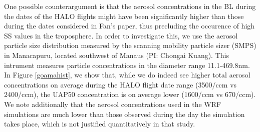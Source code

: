 \documentclass{article}
\begin{document}
One possible counterargument is that the aerosol concentrations in the BL during the dates of the HALO flights might have been significantly higher than those during the dates considered in Fan's paper, thus precluding the occurence of high SS values in the troposphere. In order to investigate this, we use the aerosol particle size distribution measured by the scanning mobility particle sizer (SMPS) in Manacapuru, located southwest of Manaus (PI: Chongai Kuang). This intrument measures particle concentrations in the diameter range 11.1-469.8nm. In Figure \ref{goamahist}, we show that, while we do indeed see higher total aerosol concentrations on average during the HALO flight date range (3500/ccm vs 2400/ccm), the UAP50 concentration is on average lower (1600/ccm vs 670/ccm). We note additionally that the aerosol concentrations used in the WRF simulations are much lower than those observed during the day the simulation takes place, which is not justified quantitatively in that study.
\end{document}
